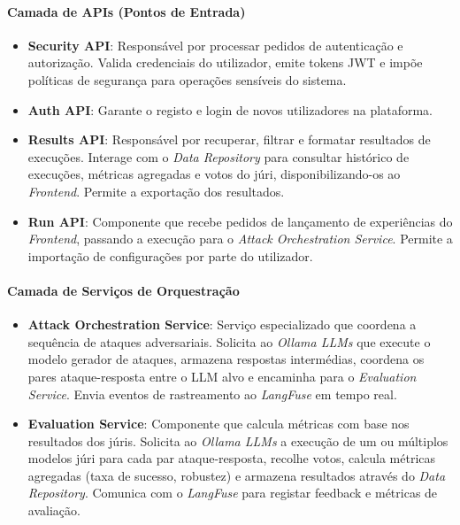 \paragraph{Camada de APIs (Pontos de Entrada)}

\begin{itemize}
\item \textbf{Security API}: Responsável por processar pedidos de autenticação e autorização. Valida credenciais do utilizador, emite tokens JWT e impõe políticas de segurança para operações sensíveis do sistema.
\item \textbf{Auth API}: Garante o registo e login de novos utilizadores na plataforma.
\item \textbf{Results API}: Responsável por recuperar, filtrar e formatar resultados de execuções. Interage com o \textit{Data Repository} para consultar histórico de execuções, métricas agregadas e votos do júri, disponibilizando-os ao \textit{Frontend}. Permite a exportação dos resultados.
\item \textbf{Run API}:  Componente que recebe pedidos de lançamento de experiências do \textit{Frontend}, passando  a execução para o \textit{Attack Orchestration Service}. Permite a importação de configurações por parte do utilizador.
\end{itemize}

\paragraph{Camada de Serviços de Orquestração}

\begin{itemize}
\item \textbf{Attack Orchestration Service}: Serviço especializado que coordena a sequência de ataques adversariais. Solicita ao \textit{Ollama LLMs} que execute o modelo gerador de ataques, armazena respostas intermédias, coordena os pares ataque-resposta entre o LLM alvo e encaminha para o \textit{Evaluation Service}. Envia eventos de rastreamento ao \textit{LangFuse} em tempo real.
\item \textbf{Evaluation Service}: Componente que calcula métricas com base nos resultados dos júris. Solicita ao \textit{Ollama LLMs} a execução de um ou múltiplos modelos júri para cada par ataque-resposta, recolhe votos, calcula métricas agregadas (taxa de sucesso, robustez) e armazena resultados através do \textit{Data Repository}. Comunica com o \textit{LangFuse} para registar feedback e métricas de avaliação.
\end{itemize}

